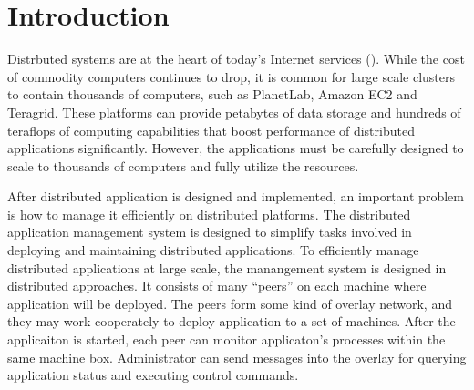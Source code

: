 \section{Introduction}


Distrbuted systems are at the heart of today's Internet
services (). While the cost of commodity
computers continues to drop, it is common for large scale
clusters to contain thousands of computers, such as
PlanetLab, Amazon EC2 and Teragrid. These platforms can
provide petabytes of data storage and hundreds of teraflops
of computing capabilities that boost performance of
distributed applications significantly. However, the
applications must be carefully designed to scale to
thousands of computers and fully utilize the resources.

After distributed application is designed and implemented,
an important problem is how to manage it efficiently on
distributed platforms.
The distributed application management system is designed to
simplify tasks involved in deploying and maintaining
distributed applications. To efficiently manage distributed
applications at large scale, the manangement system is
designed in distributed approaches. It consists of many
``peers''  on each
machine where application will be deployed. The peers form
some kind of overlay network, and they may work cooperately
to deploy application to a set of machines. After the
applicaiton is started, each peer can monitor applicaton's
processes within the same machine box.  Administrator can
send messages into the overlay for querying application
status and executing control commands.

